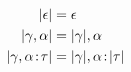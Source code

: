 \framebox{$\im \gamma = \Gamma$}

\begin{align*}
  \lvert \epsilon \rvert                    &= \epsilon \\
  \lvert \gamma, \alpha \rvert            &= \lvert \gamma \rvert, \alpha \\
  \lvert \gamma, \alpha \!:\! \tau \rvert &= \lvert \gamma \rvert, \alpha \!:\! \lvert \tau \rvert
\end{align*}